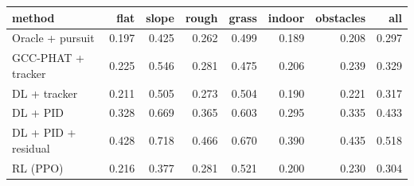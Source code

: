\begin{tabular}{lrrrrrrr}
\toprule
method & flat & slope & rough & grass & indoor & obstacles & all\\
\midrule
Oracle + pursuit & 0.197 & 0.425 & 0.262 & 0.499 & 0.189 & 0.208 & 0.297 \\
GCC-PHAT + tracker & 0.225 & 0.546 & 0.281 & 0.475 & 0.206 & 0.239 & 0.329 \\
DL + tracker & 0.211 & 0.505 & 0.273 & 0.504 & 0.190 & 0.221 & 0.317 \\
DL + PID & 0.328 & 0.669 & 0.365 & 0.603 & 0.295 & 0.335 & 0.433 \\
DL + PID + residual & 0.428 & 0.718 & 0.466 & 0.670 & 0.390 & 0.435 & 0.518 \\
RL (PPO) & 0.216 & 0.377 & 0.281 & 0.521 & 0.200 & 0.230 & 0.304 \\
\bottomrule
\end{tabular}
